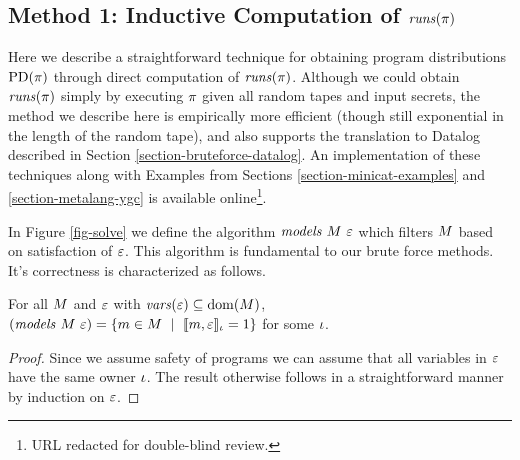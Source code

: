 \subsection{Method 1: Inductive Computation of $\mathit{runs}(\pi)$}
\label{section-bruteforce-tables}

Here we describe a straightforward technique for obtaining program
distributions $\mathrm{PD}(\pi)$ through direct computation of
$\mathit{runs}(\pi)$. Although we could obtain $\mathit{runs}(\pi)$ simply by
executing $\pi$ given all random tapes and input secrets, the method
we describe here is empirically more efficient (though still
exponential in the length of the random tape), and also supports the
translation to Datalog described in Section
\ref{section-bruteforce-datalog}. An implementation of these
techniques along with Examples from Sections
\ref{section-minicat-examples} and \ref{section-metalang-ygc} is
available online\footnote{URL redacted for double-blind review.}.

In Figure \ref{fig-solve} we define the algorithm $\mathit{models}\ M\ \varepsilon$
which filters $M$ based on satisfaction of $\varepsilon$. This algorithm
is fundamental to our brute force methods. It's correctness is characterized
as follows. 
\begin{lemma}
  \label{lemma-solves}
  For all $M$ and $\varepsilon$ with $\mathit{vars}(\varepsilon) \subseteq \mathrm{dom}(M)$,
  $(\solve{\stores}{\be}) = \{ \store \in \stores \ \mid\ \lcod{\store,\be}{\cid} = 1 \}$
  for some $\iota$.
\end{lemma}
\begin{proof}
  Since we assume safety of programs we can assume that all variables in $\varepsilon$ have the
  same owner $\iota$. The result otherwise follows in a straightforward manner by induction
  on $\varepsilon$. 
\end{proof}

